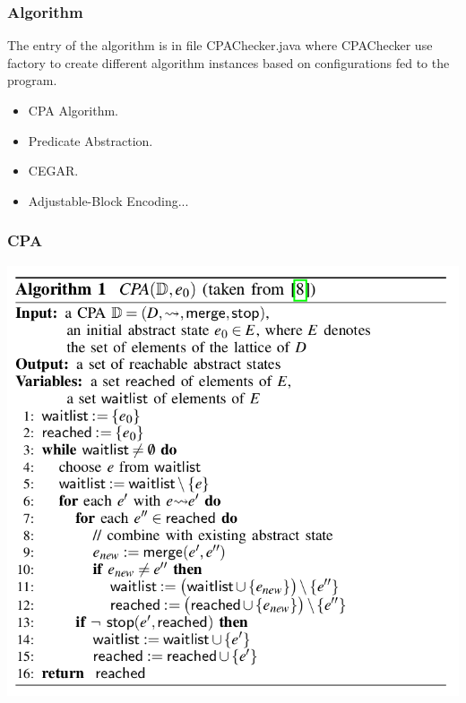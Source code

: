 \documentclass[11pt]{beamer}
\begin{document}
\begin{frame}\frametitle{Algorithm}
The entry of the algorithm is in file CPAChecker.java where CPAChecker use factory to create different algorithm instances based on configurations fed to the program.

\begin{itemize}
\item CPA Algorithm.

\item Predicate Abstraction.

\item CEGAR.

\item Adjustable-Block Encoding...
\end{itemize}
\end{frame}
\begin{frame}\frametitle{CPA}
\begin{center}
\includegraphics[scale=0.34]{cpa.png}
\end{center}
\end{frame}
\end{document}
